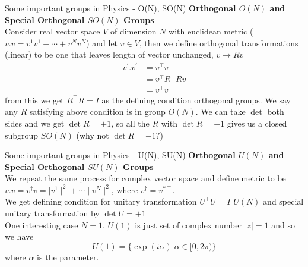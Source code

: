 \documentclass{beamer}
\begin{document}
\begin{frame}{Some important groups in Physics - O(N), SO(N)}
    \textbf{Orthogonal $O(N)$ and Special Orthogonal $SO(N)$ Groups} \\
    Consider real vector space $V$ of dimension $N$ with euclidean metric ($v.v = v^{1}v^{1} + \cdots + v^{N}v^{N}$) and let $v\in V$, then we define orthogonal transformations (linear) to be one that leaves length of vector unchanged, $v \to Rv$
    \begin{align*}
        v^{\prime}.v^{\prime} &= v^{\intercal}v \\
            &= v^{\intercal}R^{\intercal}Rv \\
            &= v^{\intercal}v
    \end{align*} from this we get $R^{\intercal}R = I$ as the defining condition orthogonal groups. We say any $R$ satisfying above condition is in group $O(N)$. We can take $\det$ both sides and we get
    $\det R = \pm 1$, so all the $R$ with $\det R = +1$ gives us a closed subgroup $SO(N)$ (why not $\det R = -1 ?$)
\end{frame}
\begin{frame}{Some important groups in Physics - U(N), SU(N)}
    \textbf{Orthogonal $U(N)$ and Special Orthogonal $SU(N)$ Groups} \\
    We repeat the same process for complex vector space and define metric to be $v.v = v^{\dagger}v = \mid{v^{1}}\mid^{2} + \cdots \mid{v^{N}}\mid^{2}$, where $v^{\dagger} = v^{*\intercal}$. \\
    \vspace{10mm}
    We get defining condition for unitary transformation $U^{\intercal}U = I $ $U(N)$ and special unitary transformation by $\det U = +1$ \\
    \vspace{5mm}
    One interesting case $N=1$, $U(1)$ is just set of complex number $\mid z\mid = 1$ and so we have \\
    \begin{equation}
        U(1) = \{\exp(i\alpha) | \alpha\in [0, 2\pi)\}
    \end{equation} where $\alpha$ is the parameter.
\end{frame}
\end{document}

